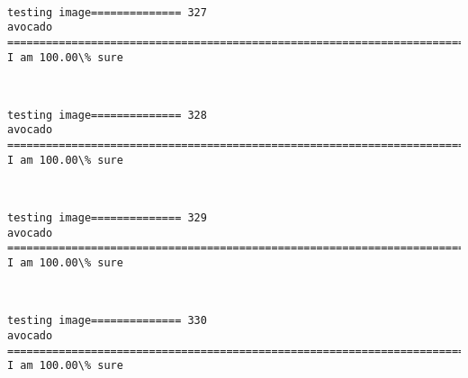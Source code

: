 \documentclass[11pt]{article}
\begin{document}
    \begin{center}
    \end{center}
    { \hspace*{\fill} \\}
    
    \begin{Verbatim}[commandchars=\\\{\}]
testing image============== 327
avocado
============================================================================
I am 100.00\% sure

    \end{Verbatim}

    \begin{center}
    \end{center}
    { \hspace*{\fill} \\}
    
    \begin{Verbatim}[commandchars=\\\{\}]
testing image============== 328
avocado
============================================================================
I am 100.00\% sure

    \end{Verbatim}

    \begin{center}
    \end{center}
    { \hspace*{\fill} \\}
    
    \begin{Verbatim}[commandchars=\\\{\}]
testing image============== 329
avocado
============================================================================
I am 100.00\% sure

    \end{Verbatim}

    \begin{center}
    \end{center}
    { \hspace*{\fill} \\}
    
    \begin{Verbatim}[commandchars=\\\{\}]
testing image============== 330
avocado
============================================================================
I am 100.00\% sure

    \end{Verbatim}
\end{document}
